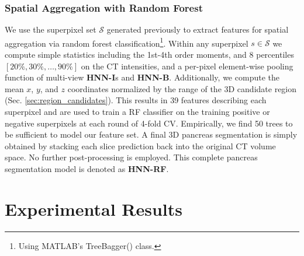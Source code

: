 \documentclass[journal]{IEEEtran}
\begin{document}
\subsubsection{Spatial Aggregation with Random Forest}\label{sec:aggregation}
We use the superpixel set $\mathcal{S}$ generated previously to extract features for spatial aggregation via random forest classification\footnote{\scriptsize Using MATLAB's TreeBagger() class.}. Within any superpixel $s \in \mathcal{S}$ we compute simple statistics including the 1st-4th order moments, and 8 percentiles $[20\%, 30\%, \dots, 90\%]$ on the CT intensities, and a per-pixel element-wise pooling function of multi-view \textbf{HNN-I}s and \textbf{HNN-B}. Additionally, we compute the mean $x$, $y$, and $z$ coordinates normalized by the range of the 3D candidate region (Sec. \ref{sec:region_candidates}). This results in 39 features describing each superpixel and are used to train a RF classifier on the training positive or negative superpixels at each round of 4-fold CV. Empirically, we find 50 trees to be sufficient to model our feature set. A final 3D pancreas segmentation is simply obtained by stacking each slice prediction back into the original CT volume space. No further post-processing is employed. This complete pancreas segmentation model is denoted as \textbf{HNN-RF}. 
\section{Experimental Results} \label{sec:results}
\end{document}
